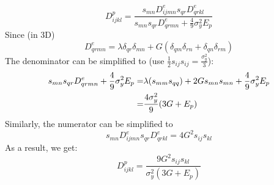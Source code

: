 \documentclass{article}
\begin{document}
\[
D^p_{ijkl}=\frac{s_{mn}D^e_{ijmn}s_{qr}D^e_{qrkl}}{s_{mn}s_{qr}D^e_{qrmn}+\frac{4}{9}\sigma_y^2 E_p}
\]
Since (in 3D)
\[
D^e_{qrmn}=\lambda \delta_{qr}\delta_{mn}+G(\delta_{qm}\delta_{rn}+\delta_{qn}\delta_{rm})
\]
The denominator can be simplified to (use $\frac{1}{2}s_{ij}s_{ij}=\frac{\sigma_y^2}{3}$):
\begin{align*}\notag
s_{mn}s_{qr}D^e_{qrmn}+\frac{4}{9}\sigma_y^2 E_p=&\lambda(s_{mm}s_{qq})+2G s_{mn}s_{mn}+\frac{4}{9}\sigma_y^2 E_p\\
=&\frac{4\sigma_y^2}{9}(3G+E_p)
\end{align*}
Similarly, the numerator can be simplified to
\[
s_{mn}D^e_{ijmn}s_{qr}D^e_{qrkl}=4G^2s_{ij}s_{kl}
\]
As a result, we get:
\begin{equation}
D^p_{ijkl}=\frac{9G^2 s_{ij}s_{kl}}{\sigma_y^2(3G+E_p)}
\end{equation}
\end{document}
